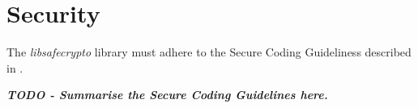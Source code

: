 \chapter{Security}
\label{ch_security}

The \textit{libsafecrypto} library must adhere to the Secure Coding Guideliness described in \cite{safecrypto_secure_coding_guidelines}.

\textbf{\textit{TODO - Summarise the Secure Coding Guidelines here.}}
